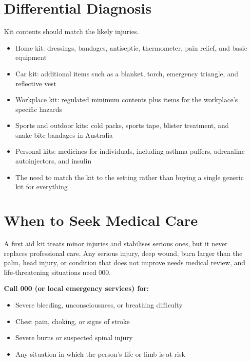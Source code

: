 \section*{Differential Diagnosis}
Kit contents should match the likely injuries.
\begin{itemize}
    \item Home kit: dressings, bandages, antiseptic, thermometer, pain relief, and basic equipment
    \item Car kit: additional items such as a blanket, torch, emergency triangle, and reflective vest
    \item Workplace kit: regulated minimum contents plus items for the workplace's specific hazards
    \item Sports and outdoor kits: cold packs, sports tape, blister treatment, and snake-bite bandages in Australia
    \item Personal kits: medicines for individuals, including asthma puffers, adrenaline autoinjectors, and insulin
    \item The need to match the kit to the setting rather than buying a single generic kit for everything
\end{itemize}

\section*{When to Seek Medical Care}
A first aid kit treats minor injuries and stabilises serious ones, but it never replaces professional care. Any serious injury, deep wound, burn larger than the palm, head injury, or condition that does not improve needs medical review, and life-threatening situations need 000.

\textbf{Call 000 (or local emergency services) for:}
\begin{itemize}
    \item Severe bleeding, unconsciousness, or breathing difficulty
    \item Chest pain, choking, or signs of stroke
    \item Severe burns or suspected spinal injury
    \item Any situation in which the person's life or limb is at risk
\end{itemize}

